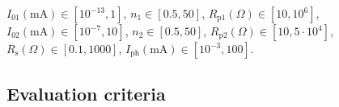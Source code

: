 \documentclass[a4paper,fleqn]{cas-dc}
\begin{document}
\noindent
$I_{01}(\mathrm{mA})\in[10^{-13},1]$,
$n_1\in[0.5,50]$,
$R_\mathrm{p1}(\Omega)\in[10,10^6]$,
$I_{02}(\mathrm{mA})\in[10^{-7},10]$,
$n_2\in[0.5,50]$,
$R_\mathrm{p2}(\Omega)\in[10,5\cdot10^4]$,
$R_\mathrm{s}(\Omega)\in[0.1,1000]$,
$I_\mathrm{ph}(\mathrm{mA})\in[10^{-3},100]$.

\subsection{Evaluation criteria}\label{EvalCr}



\end{document}

